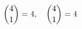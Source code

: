 \documentclass[preview]{standalone}
\begin{document}
\begin{align*}
\special{dvisvgm:raw <g id='unique000'>}\binom{4}{1}=4,\quad \binom{4}{1}=4\special{dvisvgm:raw </g>}
\end{align*}
\end{document}
